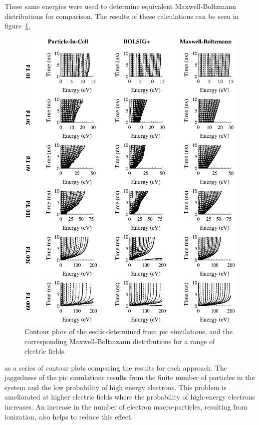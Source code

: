 These same energies were used to determine equivalent Maxwell-Boltzmann
distributions for comparison. The results of these calculations can be seen in
figure~\ref{fig:picmb},
\begin{figure}
  \centering
  \includegraphics{./chapters/modeling/figures/picmb.eps}
  \caption{Contour plots of the \acs{eedf}s determined from \acs{pic}
    simulations, and the corresponding Maxwell-Boltmzann distributions for a range
    of electric fields.}
  \label{fig:picmb}
\end{figure}
as a series of contour plots comparing the results for each approach. The
jaggedness of the \acs{pic} simulations results from the finite number of
particles in the system and the low probability of high energy electrons. This
problem is ameliorated at higher electric fields where the probability of
high-energy electrons increases. An increase in the number of electron
macro-particles, resulting from ionization, also helps to reduce this effect.

